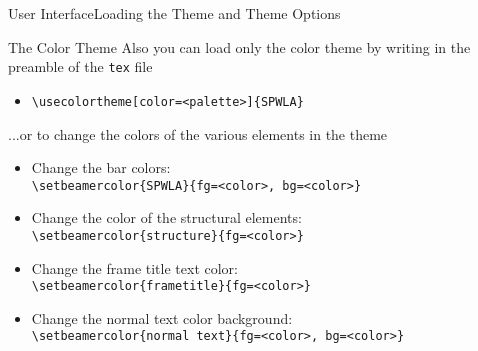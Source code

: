 \documentclass[10pt,xcolor={dvipsnames},aspectratio=169]{beamer}
\begin{document}
\begin{frame}{User Interface}{Loading the Theme and Theme Options}

  \begin{block}{The Color Theme}
    \small
    Also you can load only the color theme by writing in the preamble of the {\tt tex} file 
    
    \begin{itemize}
    \item {\tt \textbackslash usecolortheme[color=<palette>]\{SPWLA\}}
    \end{itemize}
    
    ...or to change the colors of the various elements in the theme

    \begin{itemize}
    \item Change the bar colors: \\    
    {\tt \textbackslash setbeamercolor\{SPWLA\}\{fg=<color>, bg=<color>\}}
    
    \item Change the color of the structural elements: \\    
    {\tt \textbackslash setbeamercolor\{structure\}\{fg=<color>\}}
    
    \item Change the frame title text color:\\
    {\tt \textbackslash setbeamercolor\{frametitle\}\{fg=<color>\}}
    
    \item Change the normal text color background:\\
    {\tt \textbackslash setbeamercolor\{normal text\}\{fg=<color>, bg=<color>\}}
    \end{itemize}
  \end{block}
\end{frame}


\end{document}
